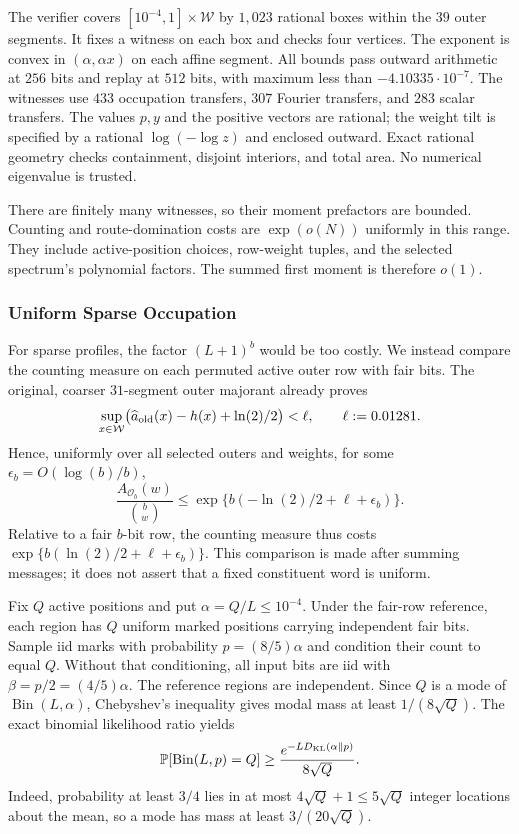 The verifier covers $[10^{-4},1]\times\mathcal W$ by $1{,}023$ rational
boxes within the $39$ outer segments. It fixes a witness on each box and
checks four vertices. The exponent is convex in $(\alpha,\alpha x)$ on
each affine segment. All bounds pass outward arithmetic at $256$ bits and
replay at $512$ bits, with maximum less than $-4.10335\cdot10^{-7}$.
The witnesses use $433$ occupation transfers, $307$ Fourier transfers, and
$283$ scalar transfers. The values $p,y$ and the positive vectors are rational;
the weight tilt is specified by a rational $\log(-\log z)$ and enclosed
outward. Exact rational geometry checks containment, disjoint interiors,
and total area. No numerical eigenvalue is trusted.

There are finitely many witnesses, so their moment prefactors are bounded.
Counting and route-domination costs are $\exp(o(N))$ uniformly in this range.
They include active-position choices, row-weight tuples, and the selected
spectrum's polynomial factors. The summed first moment is therefore $o(1)$.

\subsubsection{Uniform Sparse Occupation}
\label{app:imt-sparse}

For sparse profiles, the factor $(L+1)^b$ would be too costly. We instead
compare the counting measure on each permuted active outer row with fair
bits. The original, coarser $31$-segment outer majorant already proves
\[
 \sup_{x\in\mathcal W}\bigl(\widehat a_{\rm old}(x)-h(x)+\ln(2)/2\bigr)
 <\ell,\qquad \ell:=0.01281.
\]
Hence, uniformly over all selected outers and weights, for some
$\epsilon_b=O(\log(b)/b)$,
\begin{equation}
 \frac{A_{\mathcal O_b}(w)}{\binom bw}
 \le \exp\{b(-\ln(2)/2+\ell+\epsilon_b)\}.
 \label{eq:imt-row-likelihood}
\end{equation}
Relative to a fair $b$-bit row, the counting measure thus costs
$\exp\{b(\ln(2)/2+\ell+\epsilon_b)\}$. This comparison is made after
summing messages; it does not assert that a fixed constituent word is uniform.

Fix $Q$ active positions and put $\alpha=Q/L\le10^{-4}$.
Under the fair-row reference, each region has $Q$ uniform marked positions
carrying independent fair bits. Sample iid marks with probability
$p=(8/5)\alpha$ and condition their count to equal $Q$. Without that
conditioning, all input bits are iid with $\beta=p/2=(4/5)\alpha$.
The reference regions are independent. Since $Q$ is a mode of
$\operatorname{Bin}(L,\alpha)$, Chebyshev's inequality gives modal mass
at least $1/(8\sqrt Q)$. The exact binomial likelihood ratio yields
\[
 \mathbb P[\operatorname{Bin}(L,p)=Q]
 \ge \frac{e^{-LD_{\rm KL}(\alpha\Vert p)}}{8\sqrt Q}.
\]
Indeed, probability at least $3/4$ lies in at most $4\sqrt Q+1\le5\sqrt Q$
integer locations about the mean, so a mode has mass at least $3/(20\sqrt Q)$.

